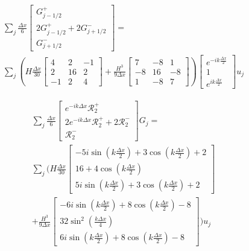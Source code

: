 \documentclass[12pt]{article}
\begin{document}
\begin{multline}
\sum_j \frac{\Delta x}{6}\begin{bmatrix} G^+_{j -1/2} \\2 G^+_{j -1/2}+2 G^-_{j +1/2} \\ G^-_{j +1/2} \end{bmatrix} = \\\sum_j \left(H\frac{\Delta x}{30}\begin{bmatrix} 4 &2 &-1 \\2 &16 &2  \\-1 &2 &4 \end{bmatrix} + \frac{H^3 }{9\Delta x}\begin{bmatrix} 7 &-8 &1  \\-8 &16 &-8  \\1 &-8 &7  \end{bmatrix} \right) \begin{bmatrix} e^{-ik\frac{\Delta x}{2}} \\1 \\ e^{ik\frac{\Delta x}{2}} \end{bmatrix} u_j
\end{multline}


\begin{multline}
\sum_j \frac{\Delta x}{6}\begin{bmatrix} e^{-ik\Delta x} \mathcal{R}^+_2 \\2 e^{-ik\Delta x} \mathcal{R}^+_2 +2 \mathcal{R}^-_2 \\ \mathcal{R}^-_2 \end{bmatrix} G_j = \\\sum_j \Bigg(H\frac{\Delta x}{30}\begin{bmatrix} -5i\sin\left(k \frac{\Delta x}{2}\right) + 3\cos\left(k \frac{\Delta x}{2}\right) + 2\\16 + 4 \cos\left(k \frac{\Delta x}{2}\right) \\ 5i\sin\left(k \frac{\Delta x}{2}\right) + 3\cos\left(k \frac{\Delta x}{2}\right) + 2 \end{bmatrix} \\+ \frac{H^3 }{9\Delta x}\begin{bmatrix} -6i\sin\left(k \frac{\Delta x}{2}\right) + 8\cos\left(k \frac{\Delta x}{2}\right) - 8 \\ 32 \sin^2 \left(\frac{k \Delta x}{4}\right) \\ 6i\sin\left(k \frac{\Delta x}{2}\right) + 8\cos\left(k \frac{\Delta x}{2}\right) - 8 \end{bmatrix}  \Bigg) u_j
\end{multline}
\end{document}
